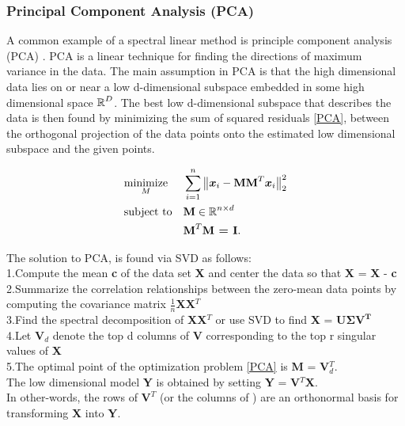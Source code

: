 \subsubsection{Principal Component Analysis (PCA)}
A common example of a spectral linear method is principle component analysis (PCA) \cite{JolliffeIT1986PCAa}. PCA is a linear technique for finding the directions
of maximum variance in the data. The main assumption in PCA is that the high dimensional data lies on or near a low d-dimensional subspace embedded in some high dimensional space $\operatorname{\mathbb{R}}^{D}$. The best low d-dimensional subspace that describes the data is then found by minimizing the sum of squared residuals    \eqref{PCA}, between the orthogonal projection of the data  points onto the estimated low dimensional subspace and the given points.

\begin{equation}\label{PCA}
\begin{aligned}
& \underset{M}{\text{minimize}}
& & \sum_{i=1}^{n} \big \lVert \boldsymbol{x}_{i} - \textbf{MM}^{T}\boldsymbol{x}_{i} \big \rVert_{2}^{2} \\
& \text{subject to}
& & \textbf{M} \in \operatorname{\mathbb{R}}^{n \times d} \\
&&& \textbf{M}^{T}\textbf{M = I}.
\end{aligned}
\end{equation}

The solution to PCA, is found via SVD \cite{Agricultural1938,BishopChristopherM2006Pram, AmericanMathematicalSociety.1939Apat} as follows:\\
1.Compute the mean \textbf{c} of the data set \textbf{X} and center
the data so that \textbf{X} = \textbf{X} - \textbf{c}\\
2.Summarize the correlation relationships between the zero-mean data points by computing the covariance matrix $\frac{1}{n}$\textbf{XX}$^{T}$\\
3.Find the spectral decomposition of \textbf{XX}$^{T}$ or 
use SVD to find \textbf{X} = $\bm{U\Sigma V^{T}}$\\
4.Let $\bm{V}_{d}$ denote the top d columns of \textbf{V} corresponding to the  top r singular values of \textbf{X}\\
5.The optimal point of the optimization problem \eqref{PCA} is \textbf{M} = \textbf{V}$_{d}^{T}$.\\
The low dimensional model \textbf{Y} is obtained by setting \textbf{Y} = \textbf{V}$^{T}$\textbf{X}.\\
In other-words, the rows of $\textbf{V}^{T}$ (or the columns of ) are an orthonormal basis for transforming \textbf{X} into \textbf{Y}.\\


